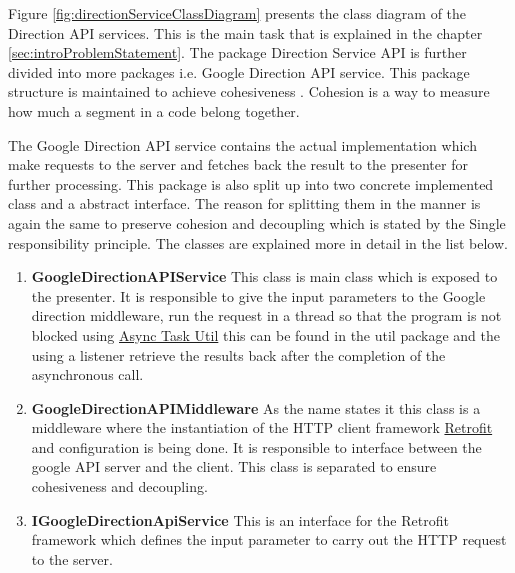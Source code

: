     \par
        Figure \ref{fig:directionServiceClassDiagram} presents the class diagram
        of the Direction API services. This is the main task that is explained
        in the chapter \ref{sec:introProblemStatement}.
        The package Direction Service API is further divided 
        into more packages i.e. Google Direction API service. This package 
        structure is maintained to achieve cohesiveness \cite{AdamCarlson}. Cohesion
        is a way to measure how much a segment in a code belong together. 
        
        \par
        The Google Direction API service contains the actual implementation 
        which make requests to the server and fetches back the result to the 
        presenter \cite{mvp} for further processing. This package is also split up into 
        two concrete implemented class and a abstract interface. The reason
        for splitting them in the manner is again the same to preserve cohesion
        and decoupling which is stated by the Single responsibility principle.
        The classes are explained more in detail in the list below. 
        \begin{enumerate}
            \item 
            \textbf{GoogleDirectionAPIService}
                This class is main class which is exposed to the presenter. It is
                responsible to give the input parameters to the Google direction 
                middleware, run the request in a thread so that the program is not
                blocked using \href{https://developer.android.com/reference/android/os/AsyncTask.html}
                {Async Task Util} this can be found in the util package and the using a listener
                retrieve the results back after the completion of the asynchronous call.
            \item 
            \textbf{GoogleDirectionAPIMiddleware}
                As the name states it this class is a middleware where the instantiation
                of the HTTP client framework \href{http://square.github.io/retrofit/} 
                {Retrofit} and configuration is being done. It is responsible
                to interface between the google API server and the client.
                This class is separated to ensure cohesiveness and decoupling.
            \item 
            \textbf{IGoogleDirectionApiService}
                This is an interface for the Retrofit framework which defines the input
                parameter to carry out the HTTP request to the server.
        \end{enumerate} 

